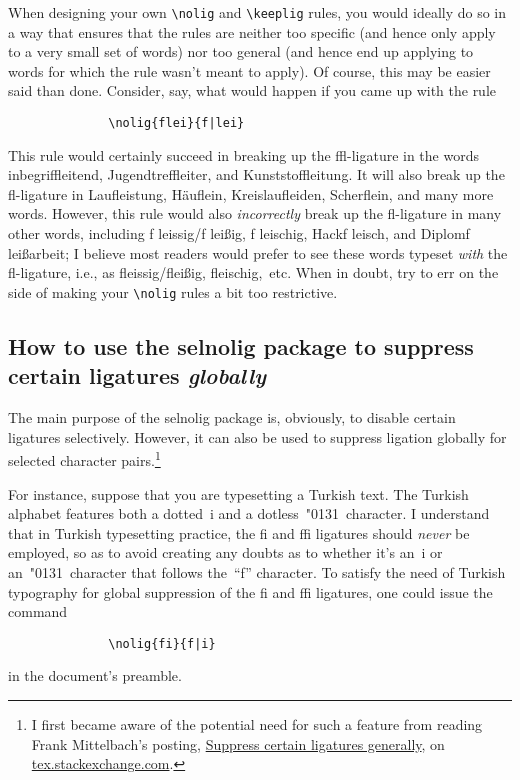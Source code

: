 \documentclass[11pt]{article}
\newcommand{\pkg}[1]{\textsf{#1}}
\newcommand{\cmmd}[1]{\texttt{\textbackslash #1}}
\begin{document}
When designing your own \cmmd{nolig} and \cmmd{keeplig} rules, you would ideally do so in a way that ensures that the rules are neither too specific (and hence only apply to a very small set of words) nor too general (and hence end up applying to words for which the rule wasn't meant to apply). Of course, this may be easier said than done. Consider, say, what would happen if you came up with the rule
\begin{Verbatim}
              \nolig{flei}{f|lei}
\end{Verbatim}
This rule would certainly succeed in breaking up the ffl-ligature in the words inbegriffleitend, Jugendtreffleiter, and Kunststoffleitung. It will also break up the fl-ligature in Laufleistung, Häuflein, Kreislaufleiden, Scherflein, and many more words. However, this rule would also \emph{incorrectly} break up the fl-ligature in many other words, including f\kern0pt leissig\slash f\kern0pt leißig, f\kern0pt leischig, Hackf\kern0pt leisch, and Diplomf\kern0pt leißarbeit; I believe most readers would prefer to see these words typeset \emph{with} the fl-ligature, i.e., as fleissig\slash fleißig, fleischig,~etc. When in doubt, try to err on the side of making your \cmmd{nolig} rules a bit too restrictive.



\subsection[How to use the selnolig package to suppress certain ligatures globally]{How to use the \pkg{selnolig} package to suppress certain ligatures \emph{globally}}
\label{sec:global-nolig}


The main purpose of the \pkg{selnolig} package is, obviously, to disable certain ligatures selectively. However, it can also be used to suppress ligation globally for selected character pairs.\footnote{I first became aware of the potential need for such a feature from reading Frank Mittelbach's posting, \href{http://tex.stackexchange.com/q/61042/5001}{Suppress certain ligatures generally}, on \url{tex.stackexchange.com}. } 

For instance, suppose that you are typesetting a Turkish text. The Turkish alphabet features both a dotted~i and a dotless~\char"0131\ character. I understand that in Turkish typesetting practice, the fi and ffi ligatures should \emph{never} be employed, so as to avoid creating any doubts as to whether it's an~i or an~\char"0131\ character that follows the~\enquote{f} character. To satisfy the need of Turkish typography for global suppression of the fi and ffi ligatures, one could issue the command
\begin{Verbatim}
              \nolig{fi}{f|i}
\end{Verbatim}
in the document's preamble.
\end{document}
